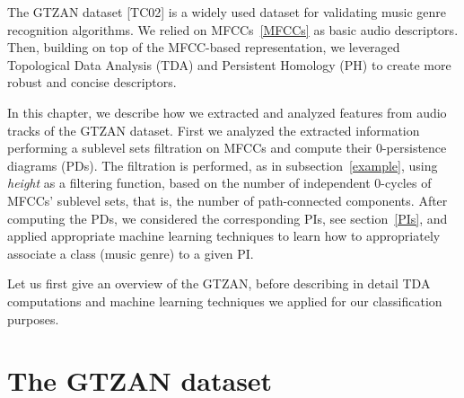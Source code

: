 \documentclass[english, LaM, oneside, noexaminfo]{sapthesis}
\begin{document}
The GTZAN dataset [TC02] is a widely used dataset for validating music genre recognition algorithms. We relied on MFCCs~\ref{MFCCs} as basic audio descriptors. Then, building on top of the MFCC-based representation, we leveraged Topological Data Analysis (TDA) and Persistent Homology (PH) to create more robust and concise descriptors.

In this chapter, we describe how we extracted and analyzed features from audio tracks of the GTZAN dataset. First we analyzed the extracted information performing a sublevel sets filtration on MFCCs and compute their $0$-persistence diagrams (PDs). The filtration is performed, as in subsection~\ref{example}, using \textit{height} as a filtering function, based on the number of independent $0$-cycles of MFCCs' sublevel sets, that is, the number of path-connected components. After computing the PDs, we considered the corresponding PIs, see section~\ref{PIs}, and applied appropriate machine learning techniques to learn how to appropriately associate a class (music genre) to a given PI.  

Let us first give an overview of the GTZAN, before describing in detail TDA computations and machine learning techniques we applied for our classification purposes.



\section{The GTZAN dataset}
\end{document}
